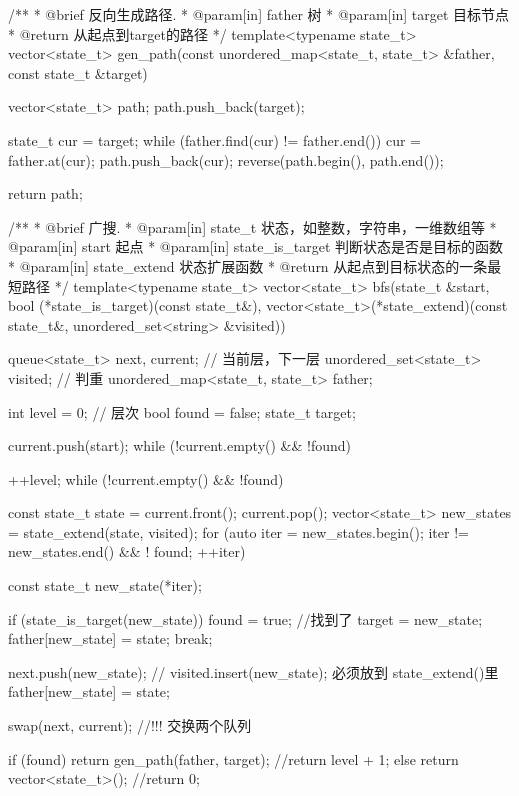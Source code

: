 \begin{Codex}[label=bfs_template1.cpp]
/**
 * @brief 反向生成路径.
 * @param[in] father 树
 * @param[in] target 目标节点
 * @return 从起点到target的路径
 */
template<typename state_t>
vector<state_t> gen_path(const unordered_map<state_t, state_t> &father,
        const state_t &target) {
    vector<state_t> path;
    path.push_back(target);

    state_t cur = target;
    while (father.find(cur) != father.end()) {
        cur = father.at(cur);
        path.push_back(cur);
    }
    reverse(path.begin(), path.end());

    return path;
}

/**
 * @brief 广搜.
 * @param[in] state_t 状态，如整数，字符串，一维数组等
 * @param[in] start 起点
 * @param[in] state_is_target 判断状态是否是目标的函数
 * @param[in] state_extend 状态扩展函数
 * @return 从起点到目标状态的一条最短路径
 */
template<typename state_t>
vector<state_t> bfs(state_t &start, bool (*state_is_target)(const state_t&),
        vector<state_t>(*state_extend)(const state_t&,
                unordered_set<string> &visited)) {
    queue<state_t> next, current; // 当前层，下一层
    unordered_set<state_t> visited; // 判重
    unordered_map<state_t, state_t> father;

    int level = 0;  // 层次
    bool found = false;
    state_t target;

    current.push(start);
    while (!current.empty() && !found) {
        ++level;
        while (!current.empty() && !found) {
            const state_t state = current.front();
            current.pop();
            vector<state_t> new_states = state_extend(state, visited);
            for (auto iter = new_states.begin();
                    iter != new_states.end() && ! found; ++iter) {
                const state_t new_state(*iter);

                if (state_is_target(new_state)) {
                    found = true; //找到了
                    target = new_state;
                    father[new_state] = state;
                    break;
                }

                next.push(new_state);
                // visited.insert(new_state); 必须放到 state_extend()里
                father[new_state] = state;
            }
        }
        swap(next, current); //!!! 交换两个队列
    }

    if (found) {
        return gen_path(father, target);
        //return level + 1;
    } else {
        return vector<state_t>();
        //return 0;
    }
}
\end{Codex}
